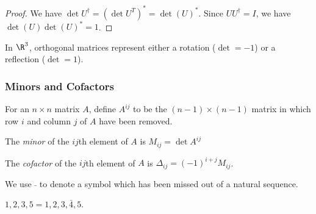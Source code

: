 \documentclass[a4paper]{article}
\begin{document}
\begin{proof}
  We have $\det U^\dagger = (\det U^T)^* = \det(U)^*$. Since $UU^\dagger = I$, we have $\det(U)\det(U)^* = 1$.
\end{proof}

\begin{prop}
  In $\R^3$, orthogonal matrices represent either a rotation ($\det = -1$) or a reflection ($\det = 1$).
\end{prop}
\subsubsection{Minors and Cofactors}
\begin{defi}
  For an $n\times n$ matrix $A$, define $A^{ij}$ to be the $(n - 1)\times (n - 1)$ matrix in which row $i$ and column $j$ of $A$ have been removed.

  The \emph{minor} of the $ij$th element of $A$ is $M_{ij} = \det A^{ij}$

  The \emph{cofactor} of the $ij$th element of $A$ is $\Delta_{ij} = (-1)^{i + j}M_{ij}$.
\end{defi}

\begin{notation}
  We use $\bar \;$ to denote a symbol which has been missed out of a natural sequence.
\end{notation}
\begin{eg}
  $1, 2, 3, 5 = 1, 2, 3, \bar 4, 5$.

\end{eg}
\end{document}
